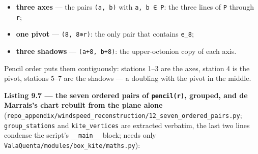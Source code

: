 \documentclass[
  10pt,
]{article}
\providecommand{\tightlist}{%
  \setlength{\itemsep}{0pt}\setlength{\parskip}{0pt}}
\begin{document}
\begin{itemize}
\tightlist
\item
  \textbf{three axes} --- the pairs \texttt{(a,\ b)} with
  \texttt{a,\ b\ ∈\ P}: the three lines of \texttt{P} through
  \texttt{r};
\item
  \textbf{one pivot} --- \texttt{(8,\ 8⊕r)}: the only pair that contains
  \texttt{e\_8};
\item
  \textbf{three shadows} --- \texttt{(a+8,\ b+8)}: the upper-octonion
  copy of each axis.
\end{itemize}

Pencil order puts them contiguously: stations 1--3 are the axes, station
4 is the pivot, stations 5--7 are the shadows --- a doubling with the
pivot in the middle.

\textbf{Listing 9.7 --- the seven ordered pairs of \texttt{pencil(r)},
grouped, and de Marrais's chart rebuilt from the plane alone}
(\texttt{repo\_appendix/windspeed\_reconstruction/12\_seven\_ordered\_pairs.py};
\texttt{group\_stations} and \texttt{kite\_vertices} are extracted
verbatim, the last two lines condense the script's \texttt{\_\_main\_\_}
block; needs only \texttt{ValaQuenta/modules/box\_kite/maths.py}):
\end{document}
